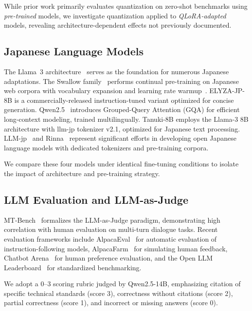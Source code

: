 \documentclass[twocolumn]{article}
\begin{document}
While prior work primarily evaluates quantization on zero-shot benchmarks using
\emph{pre-trained} models, we investigate quantization applied to \emph{QLoRA-adapted}
models, revealing architecture-dependent effects not previously documented.

\subsection{Japanese Language Models}

The Llama~3 architecture~\cite{meta2024llama3} serves as the foundation for numerous
Japanese adaptations.
The Swallow family~\cite{okazaki2024swallow} performs continual pre-training on Japanese
web corpora with vocabulary expansion and learning rate warmup~\cite{fujii2024continual}.
ELYZA-JP-8B is a commercially-released instruction-tuned variant optimized for concise
generation.
Qwen2.5~\cite{qwen2024qwen25} introduces Grouped-Query Attention (GQA) for efficient
long-context modeling, trained multilingually.
Tanuki-8B employs the Llama-3 8B architecture with llm-jp tokenizer v2.1,
optimized for Japanese text processing.
LLM-jp~\cite{sawada2024llmjp} and Rinna~\cite{mitsui2024rinna} represent significant
efforts in developing open Japanese language models with dedicated tokenizers and
pre-training corpora.

We compare these four models under identical fine-tuning conditions to isolate the impact
of architecture and pre-training strategy.

\subsection{LLM Evaluation and LLM-as-Judge}

MT-Bench~\cite{zheng2023judging} formalizes the LLM-as-Judge paradigm, demonstrating high
correlation with human evaluation on multi-turn dialogue tasks.
Recent evaluation frameworks include AlpacaEval~\cite{li2023alpacaeval} for automatic
evaluation of instruction-following models, AlpacaFarm~\cite{dubois2024alpacafarm} for
simulating human feedback, Chatbot Arena~\cite{chiang2024chatbotarena} for human preference
evaluation, and the Open LLM Leaderboard~\cite{beeching2023olm} for standardized
benchmarking.

We adopt a 0--3 scoring rubric judged by Qwen2.5-14B, emphasizing citation of specific
technical standards (score 3), correctness without citations (score 2), partial correctness
(score 1), and incorrect or missing answers (score 0).
\end{document}
